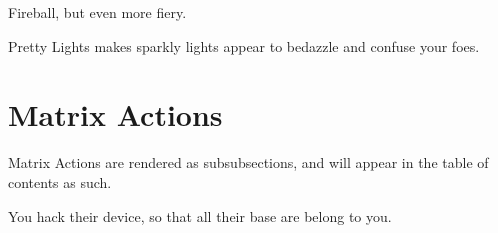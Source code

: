 \documentclass[red, openany, logo-1e]{shadowrun}
\begin{document}
{
    Fireball, but even more fiery.
}

{
    Pretty Lights makes sparkly lights appear to bedazzle and confuse your foes.
}

\section{Matrix Actions}
Matrix Actions are rendered as subsubsections, and will appear in the table of contents as such.

{
    You hack their device, so that all their base are belong to you.
}
\end{document}
